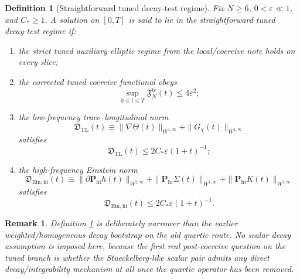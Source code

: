 \documentclass[11pt]{article}
\newtheorem{definition}{Definition}
\newtheorem{remark}{Remark}
\begin{document}
\begin{definition}[Straightforward tuned decay-test regime]
\label{def:decaytest}
Fix \(N\ge 6\), \(0<\varepsilon\ll 1\), and \(C_\ast\ge 1\). A solution on \([0,T]\) is said to lie in the \emph{straightforward tuned decay-test regime} if:
\begin{enumerate}
    \item the strict tuned auxiliary-elliptic regime from the local/coercive note holds on every slice;
    \item the corrected tuned coercive functional obeys
    \begin{equation}
    \sup_{0\le t\le T}\mathfrak F_N^{\mathrm{tc}}(t)\le 4\varepsilon^2;
    \label{eq:Fboot}
    \end{equation}
    \item the low-frequency trace--longitudinal norm
    \begin{equation}
    \mathfrak D_{\mathrm{TL}}(t)
    \equiv
    \|\nabla\Theta(t)\|_{W^{1,\infty}}
    + \|G_\chi(t)\|_{W^{1,\infty}}
    \label{eq:DTL}
    \end{equation}
    satisfies
    \begin{equation}
    \mathfrak D_{\mathrm{TL}}(t)\le 2C_\ast\varepsilon(1+t)^{-1};
    \label{eq:DTLboot}
    \end{equation}
    \item the high-frequency Einstein norm
    \begin{equation}
    \mathfrak D_{\mathrm{Ein,hi}}(t)
    \equiv
    \|\partial \mathbf P_{\mathrm{hi}}h(t)\|_{W^{2,\infty}}
    + \|\mathbf P_{\mathrm{hi}}\Sigma(t)\|_{W^{1,\infty}}
    + \|\mathbf P_{\mathrm{hi}}K(t)\|_{W^{1,\infty}}
    \label{eq:DEin}
    \end{equation}
    satisfies
    \begin{equation}
    \mathfrak D_{\mathrm{Ein,hi}}(t)\le 2C_\ast\varepsilon(1+t)^{-1}.
    \label{eq:DEinboot}
    \end{equation}
\end{enumerate}
\end{definition}

\begin{remark}
Definition \ref{def:decaytest} is deliberately narrower than the earlier weighted/homogeneous decay bootstrap on the old quartic route. No scalar decay assumption is imposed here, because the first real post-coercive question on the tuned branch is whether the Stueckelberg-like scalar pair admits any direct decay/integrability mechanism at all once the quartic operator has been removed.
\end{remark}
\end{document}
